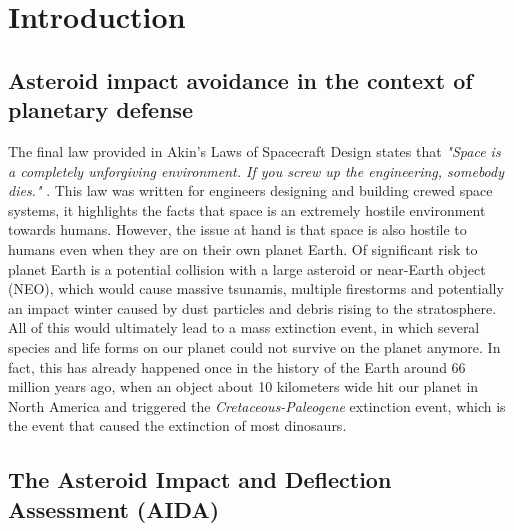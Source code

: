 \chapter{Introduction}

\section{Asteroid impact avoidance in the context of planetary defense}

The final law provided in Akin's Laws of Spacecraft Design states that \textit{"Space is a completely unforgiving environment. If you screw up the engineering, somebody dies."} \cite{akinslaws}. This law was written for engineers designing and building crewed space systems, it highlights the facts that space is an extremely hostile environment towards humans. However, the issue at hand is that space is also hostile to humans even when they are on their own planet Earth. Of significant risk to planet Earth is a potential collision with a large asteroid or near-Earth object (NEO), which would cause massive tsunamis, multiple firestorms and potentially an impact winter caused by dust particles and debris rising to the stratosphere. All of this would ultimately lead to a mass extinction event, in which several species and life forms on our planet could not survive on the planet anymore. In fact, this has already happened once in the history of the Earth around 66 million years ago, when an object about 10 kilometers wide hit our planet in North America and triggered the \textit{Cretaceous-Paleogene} extinction event, which is the event that caused the extinction of most dinosaurs. 

\section{The Asteroid Impact and Deflection Assessment (AIDA)}